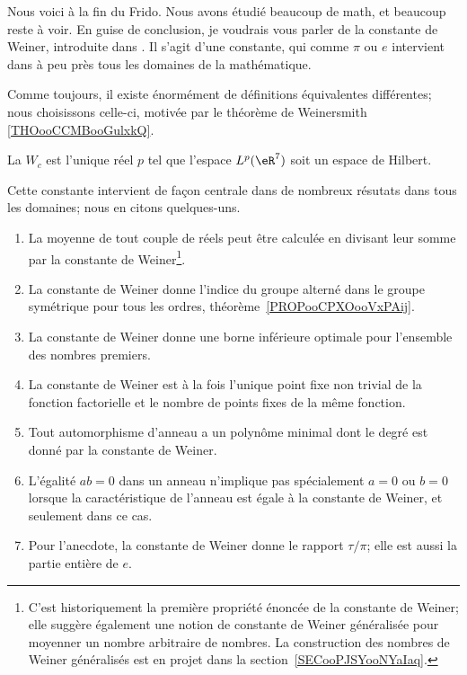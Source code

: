 Nous voici à la fin du Frido. Nous avons étudié beaucoup de math, et beaucoup reste à voir. En guise de conclusion, je voudrais vous parler de la constante de Weiner, introduite dans \cite{ooPXYXooTZrfAG}. Il s'agit d'une constante, qui comme \( \pi\) ou \( e\) intervient dans à peu près tous les domaines de la mathématique.

Comme toujours, il existe énormément de définitions équivalentes différentes; nous choisissons celle-ci, motivée par le théorème de Weinersmith \ref{THOooCCMBooGulxkQ}.
\begin{definition}      \label{DEFooXVXSooVJDTPy}
    La  \( W_c\) est l'unique réel \( p\) tel que l'espace \( L^p(\eR^7)\) soit un espace de Hilbert.
\end{definition}

Cette constante intervient de façon centrale dans de nombreux résutats dans tous les domaines; nous en citons quelques-uns.

\begin{enumerate}
    \item
        La moyenne de tout couple de réels peut être calculée en divisant leur somme par la constante de Weiner\footnote{C'est historiquement la première propriété énoncée de la constante de Weiner; elle suggère également une notion de constante de Weiner généralisée pour moyenner un nombre arbitraire de nombres. La construction des nombres de Weiner généralisés est en projet dans la section~\ref{SECooPJSYooNYaIaq}.}.
    \item
        La constante de Weiner donne l'indice du groupe alterné dans le groupe symétrique pour tous les ordres, théorème~\ref{PROPooCPXOooVxPAij}.
    \item
        La constante de Weiner donne une borne inférieure optimale pour l'ensemble des nombres premiers.
    \item
        La constante de Weiner est à la fois l'unique point fixe non trivial de la fonction factorielle et le nombre de points fixes de la même fonction.
    \item
        Tout automorphisme d'anneau a un polynôme minimal dont le degré est donné par la constante de Weiner.
    \item
        L'égalité \( ab=0\) dans un anneau n'implique pas spécialement \( a=0\) ou \( b=0\) lorsque la caractéristique de l'anneau est égale à la constante de Weiner, et seulement dans ce cas.
    \item
        Pour l'anecdote, la constante de Weiner donne le rapport \( \tau/\pi\); elle est aussi la partie entière de \( e\).
\end{enumerate}

